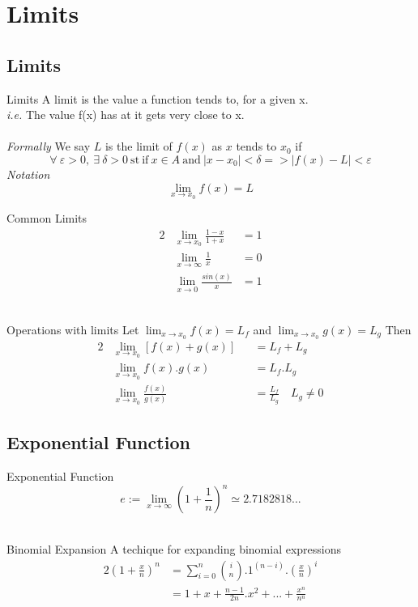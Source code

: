 \documentclass[11pt,a4paper]{article}
\begin{document}
\section{Limits}
\subsection{Limits}
\subtitle{Definition 2.01 - }{Limits}
A limit is the value a function tends to, for a given x. \\
\textit{i.e.} The value f(x) has at it gets very close to x. \\
\\\textit{Formally} We say $L$ is the limit of $f(x)$ as $x$ tends to $x_0$ if $$\forall\ \varepsilon > 0,\ \exists\ \delta > 0\ \mathrm{st\ if}\ x \in A\ \mathrm{and}\ |x - x_0| < \delta => |f(x) - L| < \varepsilon$$
\textit{Notation} $$\lim_{x \to x_0} f(x) = L$$

\newpages
\subtitle{Remark 2.02 - }{Common Limits}
\begin{alignat*}{2}
  &\lim_{x \to x_0} \frac{1-x}{1+x} &= 1 \\
  &\lim_{x \to \infty} \frac{1}{x} &= 0 \\
  &\lim_{x \to 0} \frac{sin(x)}{x} &= 1
\end{alignat*} \\

\subtitle{Theorem 2.03 - }{Operations with limits}
Let $\lim_{x \to x_0} f(x) = L_f$ and $\lim_{x \to x_0} g(x) = L_g$
Then
\begin{alignat*}{2}
  &\lim_{x \to x_0} \left[f(x) + g(x)\right] &&= L_f + L_g \\
  &\lim_{x \to x_0} f(x).g(x) &&= L_f.L_g \\
  &\lim_{x \to x_0} \frac{f(x)}{g(x)} &&= \frac{L_f}{L_g} \quad L_g \not = 0
\end{alignat*}

\subsection{Exponential Function}
\subtitle{Definition 2.04 - }{Exponential Function}
$$e := \lim_{x \to \infty} \left(1+\frac{1}{n}\right)^n \simeq 2.7182818...$$\\

\subtitle{Theorem 2.05 - }{Binomial Expansion}
A techique for expanding binomial expressions
\begin{alignat*}{2}
\left(1+\frac{x}{n}\right)^n &= \sum_{i=0}^{n} \binom{i}{n} . 1^{(n-i)} . \left(\frac{x}{n}\right)^i \\
&= 1 + x + \frac{n-1}{2n}.x^2 + ... + \frac{x^n}{n^n}
\end{alignat*}
\end{document}
